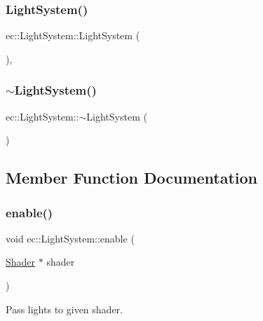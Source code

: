 \subsubsection{\texorpdfstring{Light\+System()}{LightSystem()}}
{\footnotesize\ttfamily ec\+::\+Light\+System\+::\+Light\+System (\begin{DoxyParamCaption}{ }\end{DoxyParamCaption})\hspace{0.3cm}{\ttfamily [explicit]}, {\ttfamily [default]}}

\mbox{\label{classec_1_1_light_system_a945503a2b607e87f13f87e5f95d157ef}} 
\subsubsection{\texorpdfstring{$\sim$\+Light\+System()}{~LightSystem()}}
{\footnotesize\ttfamily ec\+::\+Light\+System\+::$\sim$\+Light\+System (\begin{DoxyParamCaption}{ }\end{DoxyParamCaption})\hspace{0.3cm}{\ttfamily [default]}}



\subsection{Member Function Documentation}
\mbox{\label{classec_1_1_light_system_a6569ed0dd8a15a461358add2ee514f92}} 
\subsubsection{\texorpdfstring{enable()}{enable()}}
{\footnotesize\ttfamily void ec\+::\+Light\+System\+::enable (\begin{DoxyParamCaption}\item[{\mbox{\hyperlink{classec_1_1_shader}{Shader}} $\ast$}]{shader }\end{DoxyParamCaption})}



Pass lights to given shader. 


